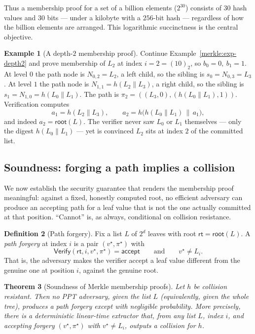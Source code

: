 \documentclass[11pt,a4paper]{article}
\newtheorem{theorem}{Theorem}[section]
\theoremstyle{definition}
\newtheorem{definition}[theorem]{Definition}
\newtheorem{example}[theorem]{Example}
\theoremstyle{remark}
\begin{document}
Thus a membership proof for a set of a billion elements (\(2^{30}\)) consists of \(30\) hash values and \(30\) bits --- under a kilobyte with a \(256\)-bit hash --- regardless of how the billion elements are arranged. This logarithmic succinctness is the central objective.

\begin{example}[A depth-\(2\) membership proof]\label{merkle:exp-proof}
Continue Example~\ref{merkle:exp-depth2} and prove membership of \(L_2\) at index \(i = 2 = (10)_2\), so \(b_0 = 0,\ b_1 = 1\). At level \(0\) the path node is \(N_{0,2} = L_2\), a left child, so the sibling is \(s_0 = N_{0,3} = L_3\). At level \(1\) the path node is \(N_{1,1} = h(L_2\|L_3)\), a right child, so the sibling is \(s_1 = N_{1,0} = h(L_0\|L_1)\). The path is \(\pi_2 = ((L_3, 0), (h(L_0\|L_1), 1))\). Verification computes
\[
a_1 = h(L_2 \| L_3), \qquad a_2 = h\bigl(h(L_0\|L_1) \,\|\, a_1\bigr),
\]
and indeed \(a_2 = \mathsf{root}(L)\). The verifier never saw \(L_0\) or \(L_1\) themselves --- only the digest \(h(L_0\|L_1)\) --- yet is convinced \(L_2\) sits at index \(2\) of the committed list.
\end{example}

\subsection{Soundness: forging a path implies a collision}\label{merkle:sec-soundness}

We now establish the security guarantee that renders the membership proof meaningful: against a fixed, honestly computed root, no efficient adversary can produce an accepting path for a leaf value that is not the one actually committed at that position. ``Cannot'' is, as always, conditional on collision resistance.

\begin{definition}[Path forgery]\label{merkle:def-forgery}
Fix a list \(L\) of \(2^d\) leaves with root \(\mathsf{rt} = \mathsf{root}(L)\). A \emph{path forgery} at index \(i\) is a pair \((v^\star, \pi^\star)\) with
\[
\mathsf{Verify}(\mathsf{rt}, i, v^\star, \pi^\star) = \mathsf{accept}
\qquad\text{and}\qquad
v^\star \neq L_i.
\]
That is, the adversary makes the verifier accept a leaf value different from the genuine one at position \(i\), against the genuine root.
\end{definition}

\begin{theorem}[Soundness of Merkle membership proofs]\label{merkle:thm-soundness}
Let \(h\) be collision resistant. Then no PPT adversary, given the list \(L\) (equivalently, given the whole tree), produces a path forgery except with negligible probability. More precisely, there is a deterministic linear-time extractor that, from any list \(L\), index \(i\), and accepting forgery \((v^\star, \pi^\star)\) with \(v^\star \neq L_i\), outputs a collision for \(h\).
\end{theorem}
\end{document}
